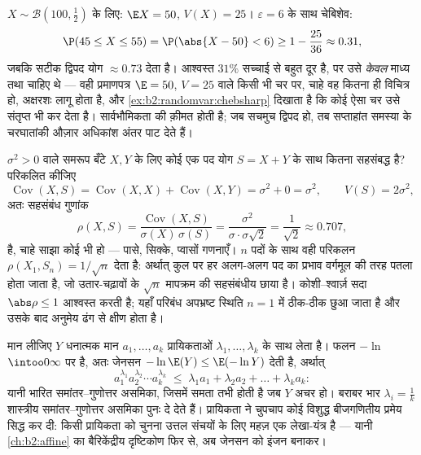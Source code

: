 \begin{example}[सौ उछालों पर
चेबिशेव]\label{ex:b2:randomvar:hundredtosses}
$X \sim \mathcal B(100, \frac12)$ के लिए: $\E X = 50$, $V(X) =
25$। $\varepsilon = 6$ के साथ चेबिशेव:
\[
\P(45 \leq X \leq 55) = \P(\abs{X - 50} < 6)
\geq 1 - \frac{25}{36} \approx 0.31 ,
\]
जबकि सटीक द्विपद योग $\approx 0.73$ देता है। आश्वस्त $31\%$ सच्चाई से बहुत दूर
है, पर उसे \emph{केवल} माध्य तथा  चाहिए थे --- वही प्रमाणपत्र
$\E = 50$, $V = 25$ वाले किसी भी चर पर, चाहे वह कितना ही विचित्र हो, अक्षरशः
लागू होता है, और \cref{ex:b2:randomvar:chebsharp} दिखाता है कि कोई ऐसा चर उसे संतृप्त भी कर
देता है। सार्वभौमिकता की क़ीमत होती है; जब  सचमुच द्विपद हो, तब
सप्ताहांत समस्या के चरघातांकी औज़ार अधिकांश अंतर पाट देते हैं।
\end{example}

\begin{example}\label{ex:b2:randomvar:partwhole}
 $\sigma^2 > 0$ वाले  समरूप बँटे $X, Y$ के लिए कोई एक पद योग $S = X + Y$
के साथ कितना सहसंबद्ध है? परिकलित कीजिए
\[
\operatorname{Cov}(X, S) = \operatorname{Cov}(X, X) +
\operatorname{Cov}(X, Y) = \sigma^2 + 0 = \sigma^2,
\qquad V(S) = 2\sigma^2,
\]
अतः सहसंबंध गुणांक
\[
\rho(X, S) = \frac{\operatorname{Cov}(X,
S)}{\sigma(X)\,\sigma(S)}
= \frac{\sigma^2}{\sigma\cdot\sigma\sqrt2}
= \frac{1}{\sqrt2} \approx 0.707 ,
\]
है, चाहे साझा  कोई भी हो --- पासे, सिक्के, प्वासों गणनाएँ।
$n$ पदों के साथ वही परिकलन $\rho(X_1, S_n) =
1/\sqrt n$ देता है: अर्थात् कुल पर हर
अलग-अलग पद का प्रभाव वर्गमूल की तरह पतला होता जाता है, जो
उतार-चढ़ावों के $\sqrt n$ मापक्रम की सहसंबंधीय छाया है। कोशी--श्वार्ज़
सदा $\abs\rho \leq 1$ आश्वस्त करती है; यहाँ परिबंध अपभ्रष्ट स्थिति $n = 1$ में
ठीक-ठीक छुआ जाता है और उसके बाद अनुमेय ढंग से क्षीण होता है।
\end{example}

\begin{example}[जेनसन से भारित
समांतर--गुणोत्तर माध्य]\label{ex:b2:randomvar:amgm}
मान लीजिए $Y$ धनात्मक मान $a_1, \dots, a_k$ प्रायिकताओं $\lambda_1, \dots, \lambda_k$ के साथ लेता है। फलन
$-\ln$ $\intoo0\infty$ पर  है, अतः जेनसन $-\ln\E(Y) \leq \E(-\ln Y)$ देती है, अर्थात्
\[
a_1^{\lambda_1}a_2^{\lambda_2}\cdots a_k^{\lambda_k}
\;\leq\; \lambda_1a_1 + \lambda_2a_2 + \dots + \lambda_ka_k :
\]
यानी भारित समांतर--गुणोत्तर असमिका, जिसमें समता तभी होती है जब $Y$
अचर हो। बराबर भार $\lambda_i = \frac1k$ शास्त्रीय समांतर--गुणोत्तर असमिका पुनः दे
देते हैं। प्रायिकता ने चुपचाप कोई विशुद्ध बीजगणितीय प्रमेय सिद्ध कर
दी: किसी प्रायिकता  को चुनना उत्तल संचयों के लिए महज़ एक
लेखा-यंत्र है --- यानी \cref{ch:b2:affine} का बैरिकेंद्रीय दृष्टिकोण फिर से, अब
जेनसन को इंजन बनाकर।
\end{example}


